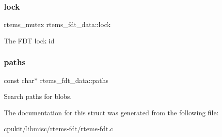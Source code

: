 \subsubsection{\texorpdfstring{lock}{lock}}
{\footnotesize\ttfamily rtems\+\_\+mutex rtems\+\_\+fdt\+\_\+data\+::lock}

The F\+DT lock id \mbox{\label{structrtems__fdt__data_a70cb3b2729f46e1927255f89ee1b8885}} 
\subsubsection{\texorpdfstring{paths}{paths}}
{\footnotesize\ttfamily const char$\ast$ rtems\+\_\+fdt\+\_\+data\+::paths}

Search paths for blobs. 

The documentation for this struct was generated from the following file\+:\begin{DoxyCompactItemize}
\item 
cpukit/libmisc/rtems-\/fdt/rtems-\/fdt.\+c\end{DoxyCompactItemize}

